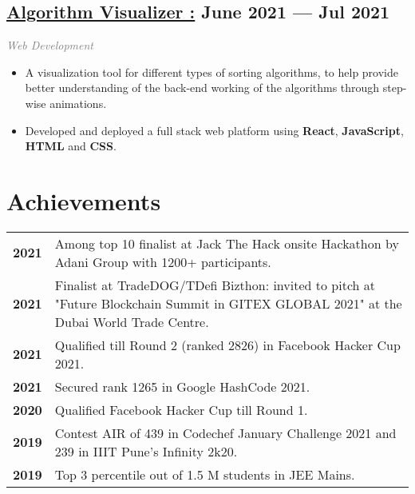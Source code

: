 \documentclass[a4,10pt]{article}
\def\gray#1{\textcolor{gray}{#1}}
\newenvironment{zitemize}{
\begin{itemize}\itemsep0pt \parskip0pt \parsep1pt}
{\end{itemize}\vspace{-0.5cm}}
\newcommand{\hskills}[1]{
\textbf{\bfseries #1} }
\begin{document}
\subsection*{\href{https://github.com/Sigsev-Dev/Algorithm-Visualizer}{Algorithm Visualizer :} \hfill June 2021 --- Jul 2021} 
\vspace{-0.05cm}
{\normalsize \normalfont \emph{\gray{Web Development}}} 
\vspace{-0.25cm}
    \begin{zitemize}
        \item A visualization tool for different types of sorting algorithms, to help provide better understanding of the back-end working of the algorithms through step-wise animations. 
        \item Developed and deployed a full stack web platform using \textbf{React}, \textbf{JavaScript}, \textbf{HTML} and \textbf{CSS}.
    \end{zitemize}



\vspace{-0.05cm}
\section{Achievements}

\begin{tabular}[t]{ p{4em} p{50em}}
\hskills{2021} & Among top 10 finalist at Jack The Hack onsite Hackathon by Adani Group with 1200+ participants. \\ %
\hskills{2021} & Finalist at TradeDOG/TDefi Bizthon: invited to pitch at "Future Blockchain Summit in GITEX GLOBAL 2021" at the Dubai World Trade Centre.\\ %
\hskills{2021} & Qualified till Round 2 (ranked 2826) in Facebook Hacker Cup 2021.\\ %
\hskills{2021} & Secured rank 1265 in Google HashCode 2021.\\ %
\hskills{2020} & Qualified Facebook Hacker Cup till Round 1.\\ %
\hskills{2019} & Contest AIR of 439 in Codechef January Challenge 2021 and 239 in IIIT Pune's Infinity 2k20.\\ %
\hskills{2019} & Top 3 percentile out of 1.5 M students in JEE Mains. \\ %
\end{tabular}
\vspace{-0.35cm}
\end{document}
